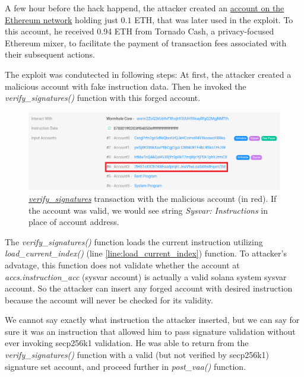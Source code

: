 \documentclass[fleqn,10pt]{olplainarticle}
\begin{document}
A few hour before the hack happend, the attacker created an \href{https://etherscan.io/address/0x629e7da20197a5429d30da36e77d06cdf796b71a#internaltx}{\color{red}account on the Ethereum network} holding just $0.1$ ETH, that was later used in the exploit. To this account, he received 0.94 ETH from Tornado Cash, a privacy-focused Ethereum mixer, to facilitate the payment of transaction fees associated with their subsequent actions.

The exploit was condutected in following steps: At first, the attacker created a malicious account with fake instruction data. Then he invoked the \emph{verify\_signatures()} function with this forged account.

\begin{figure}[h!]
  \centering
  \includegraphics[width=\linewidth]{images/mal_acc.png}
  \caption{\href{https://solscan.io/tx/25Zu1L2Q9uk998d5GMnX43t9u9eVBKvbVtgHndkc2GmUFed8Pu73LGW6hiDsmGXHykKUTLkvUdh4yXPdL3Jo4wVS}{\color{blue}\emph{\underline{verify\_signatures}}} transaction with the malicious account (in red). If the account was valid, we would see string \emph{Sysvar: Instructions} in place of account address.}
  \label{fig:mal_acc}
\end{figure}

The \emph{verify\_signatures()} function loads the current instruction utilizing \emph{load\_current\_index()} (line \ref{line:load_current_index}) function. To attacker's advatage, this function does not validate whether the account at \emph{accs.instruction\_acc} (sysvar account) is actually a valid solana system sysvar account. So the attacker can insert any forged account with desired instruction because the account will never be checked for its validity.

We cannot say exactly what instruction the attacker inserted, but we can say for sure it was an instruction that allowed him to pass signature validation without ever invoking secp256k1 validation. He was able to return from the \emph{verify\_signatures()} function with a valid (but not verified by secp256k1) signature set account, and proceed further in \emph{post\_vaa()} function.
\end{document}
